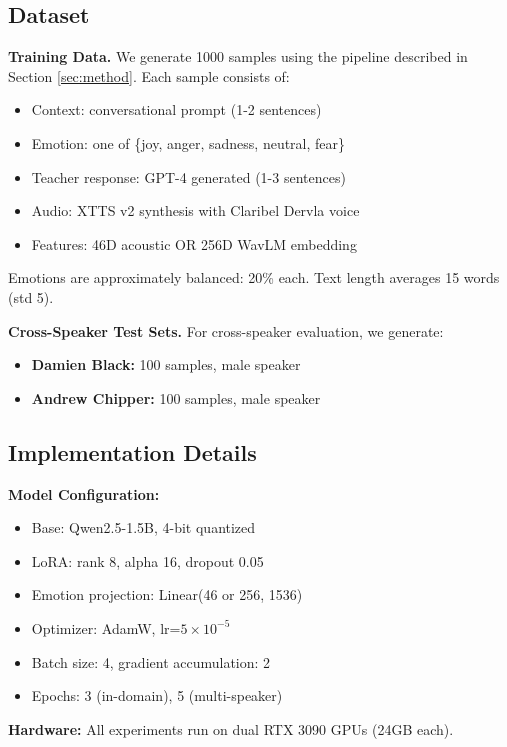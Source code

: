 \subsection{Dataset}

\textbf{Training Data.} We generate 1000 samples using the pipeline described in Section \ref{sec:method}. Each sample consists of:
\begin{itemize}
    \item Context: conversational prompt (1-2 sentences)
    \item Emotion: one of \{joy, anger, sadness, neutral, fear\}
    \item Teacher response: GPT-4 generated (1-3 sentences)
    \item Audio: XTTS v2 synthesis with Claribel Dervla voice
    \item Features: 46D acoustic OR 256D WavLM embedding
\end{itemize}

Emotions are approximately balanced: 20\% each. Text length averages 15 words (std 5).

\textbf{Cross-Speaker Test Sets.} For cross-speaker evaluation, we generate:
\begin{itemize}
    \item \textbf{Damien Black:} 100 samples, male speaker
    \item \textbf{Andrew Chipper:} 100 samples, male speaker
\end{itemize}

\subsection{Implementation Details}

\textbf{Model Configuration:}
\begin{itemize}
    \item Base: Qwen2.5-1.5B, 4-bit quantized
    \item LoRA: rank 8, alpha 16, dropout 0.05
    \item Emotion projection: Linear(46 or 256, 1536)
    \item Optimizer: AdamW, lr=$5 \times 10^{-5}$
    \item Batch size: 4, gradient accumulation: 2
    \item Epochs: 3 (in-domain), 5 (multi-speaker)
\end{itemize}

\textbf{Hardware:} All experiments run on dual RTX 3090 GPUs (24GB each).

